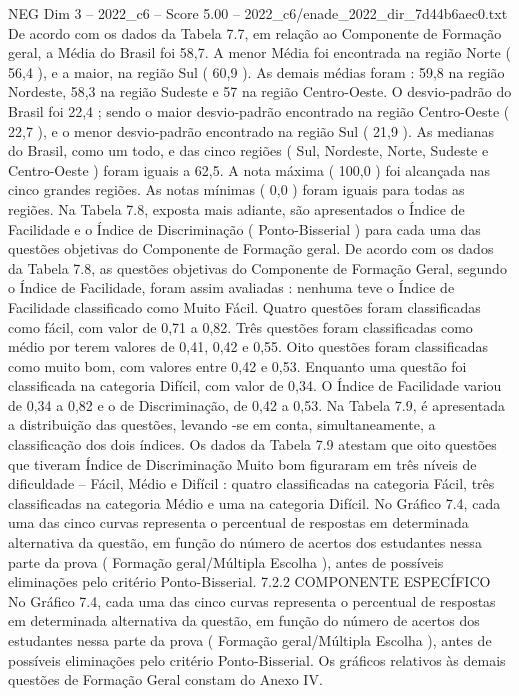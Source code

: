 \begin{textsample}{NEG Dim 3 – 2022\_c6 – Score 5.00 – 2022\_c6/enade\_2022\_dir\_7d44b6aec0.txt}
De acordo com os dados da Tabela 7.7, em relação ao Componente de Formação geral, a Média do Brasil foi 58,7.
A menor Média foi encontrada na região Norte ( 56,4 ), e a maior, na região Sul ( 60,9 ).
As demais médias foram : 59,8 na região Nordeste, 58,3 na região Sudeste e 57 na região Centro-Oeste.
O desvio-padrão do Brasil foi 22,4 ; sendo o maior desvio-padrão encontrado na região Centro-Oeste ( 22,7 ), e o menor desvio-padrão encontrado na região Sul ( 21,9 ).
As medianas do Brasil, como um todo, e das cinco regiões ( Sul, Nordeste, Norte, Sudeste e Centro-Oeste ) foram iguais a 62,5.
A nota máxima ( 100,0 ) foi alcançada nas cinco grandes regiões.
As notas mínimas ( 0,0 ) foram iguais para todas as regiões.
Na Tabela 7.8, exposta mais adiante, são apresentados o Índice de Facilidade e o Índice de Discriminação ( Ponto-Bisserial ) para cada uma das questões objetivas do Componente de Formação geral.
De acordo com os dados da Tabela 7.8, as questões objetivas do Componente de Formação Geral, segundo o Índice de Facilidade, foram assim avaliadas : nenhuma teve o Índice de Facilidade classificado como Muito Fácil.
Quatro questões foram classificadas como fácil, com valor de 0,71 a 0,82.
Três questões foram classificadas como médio por terem valores de 0,41, 0,42 e 0,55.
Oito questões foram classificadas como muito bom, com valores entre 0,42 e 0,53.
Enquanto uma questão foi classificada na categoria Difícil, com valor de 0,34.
O Índice de Facilidade variou de 0,34 a 0,82 e o de Discriminação, de 0,42 a 0,53.
Na Tabela 7.9, é apresentada a distribuição das questões, levando -se em conta, simultaneamente, a classificação dos dois índices.
Os dados da Tabela 7.9 atestam que oito questões que tiveram Índice de Discriminação Muito bom figuraram em três níveis de dificuldade – Fácil, Médio e Difícil : quatro classificadas na categoria Fácil, três classificadas na categoria Médio e uma na categoria Difícil.
No Gráfico 7.4, cada uma das cinco curvas representa o percentual de respostas em determinada alternativa da questão, em função do número de acertos dos estudantes nessa parte da prova ( Formação geral/Múltipla Escolha ), antes de possíveis eliminações pelo critério Ponto-Bisserial. 7.2.2 COMPONENTE ESPECÍFICO No Gráfico 7.4, cada uma das cinco curvas representa o percentual de respostas em determinada alternativa da questão, em função do número de acertos dos estudantes nessa parte da prova ( Formação geral/Múltipla Escolha ), antes de possíveis eliminações pelo critério Ponto-Bisserial.
Os gráficos relativos às demais questões de Formação Geral constam do Anexo IV.

\end{textsample}
